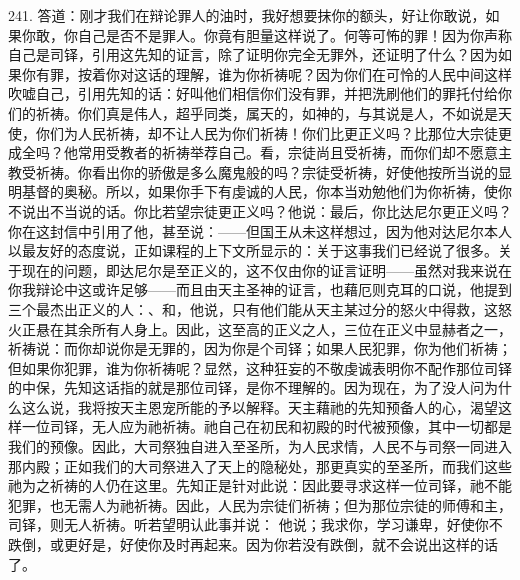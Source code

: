 241. 答道：刚才我们在辩论罪人的油时，我好想要抹你的额头，好让你敢说，如果你敢，你自己是否不是罪人。你竟有胆量这样说了。何等可怖的罪！因为你声称自己是司铎，引用这先知的证言，除了证明你完全无罪外，还证明了什么？因为如果你有罪，按着你对这话的理解，谁为你祈祷呢？因为你们在可怜的人民中间这样吹嘘自己，引用先知的话：好叫他们相信你们没有罪，并把洗刷他们的罪托付给你们的祈祷。你们真是伟人，超乎同类，属天的，如神的，与其说是人，不如说是天使，你们为人民祈祷，却不让人民为你们祈祷！你们比更正义吗？比那位大宗徒更成全吗？他常用受教者的祈祷举荐自己。看，宗徒尚且受祈祷，而你们却不愿意主教受祈祷。你看出你的骄傲是多么魔鬼般的吗？宗徒受祈祷，好使他按所当说的显明基督的奥秘。所以，如果你手下有虔诚的人民，你本当劝勉他们为你祈祷，使你不说出不当说的话。你比若望宗徒更正义吗？他说：最后，你比达尼尔更正义吗？你在这封信中引用了他，甚至说：——但国王从未这样想过，因为他对达尼尔本人以最友好的态度说，正如课程的上下文所显示的：关于这事我们已经说了很多。关于现在的问题，即达尼尔是至正义的，这不仅由你的证言证明——虽然对我来说在你我辩论中这或许足够——而且由天主圣神的证言，也藉厄则克耳的口说，他提到三个最杰出正义的人：、和，他说，只有他们能从天主某过分的怒火中得救，这怒火正悬在其余所有人身上。因此，这至高的正义之人，三位在正义中显赫者之一，祈祷说：而你却说你是无罪的，因为你是个司铎；如果人民犯罪，你为他们祈祷；但如果你犯罪，谁为你祈祷呢？显然，这种狂妄的不敬虔诚表明你不配作那位司铎的中保，先知这话指的就是那位司铎，是你不理解的。因为现在，为了没人问为什么这么说，我将按天主恩宠所能的予以解释。天主藉祂的先知预备人的心，渴望这样一位司铎，无人应为祂祈祷。祂自己在初民和初殿的时代被预像，其中一切都是我们的预像。因此，大司祭独自进入至圣所，为人民求情，人民不与司祭一同进入那内殿；正如我们的大司祭进入了天上的隐秘处，那更真实的至圣所，而我们这些祂为之祈祷的人仍在这里。先知正是针对此说：因此要寻求这样一位司铎，祂不能犯罪，也无需人为祂祈祷。因此，人民为宗徒们祈祷；但为那位宗徒的师傅和主，司铎，则无人祈祷。听若望明认此事并说： 他说；我求你，学习谦卑，好使你不跌倒，或更好是，好使你及时再起来。因为你若没有跌倒，就不会说出这样的话了。\par

